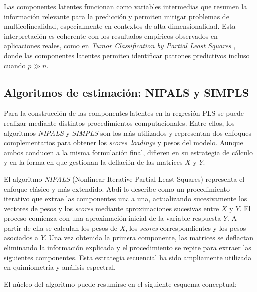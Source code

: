 \documentclass[12pt,a4paper]{report}
\begin{document}
Las componentes latentes funcionan como variables intermedias que resumen la información relevante para la predicción y permiten mitigar problemas de multicolinealidad, especialmente en contextos de alta dimensionalidad. Esta interpretación es coherente con los resultados empíricos observados en aplicaciones reales, como en \textit{Tumor Classification by Partial Least Squares} \cite{nguyen2002}, donde las componentes latentes permiten identificar patrones predictivos incluso cuando \(p \gg n\).


\subsection{Algoritmos de estimación: NIPALS y SIMPLS}

Para la construcción de las componentes latentes en la regresión PLS se puede realizar mediante distintos procedimientos computacionales. Entre ellos, los algoritmos \textit{NIPALS} y \textit{SIMPLS} son los más utilizados y representan dos enfoques complementarios para obtener los \textit{scores}, \textit{loadings} y pesos del modelo. Aunque ambos conducen a la misma formulación final, difieren en su estrategia de cálculo y en la forma en que gestionan la deflación de las matrices \(X\) y \(Y\).

El algoritmo \textit{NIPALS} (Nonlinear Iterative Partial Least Squares) representa el enfoque clásico y más extendido. Abdi \cite{abdi2010} lo describe como un procedimiento iterativo que extrae las componentes una a una, actualizando sucesivamente los vectores de pesos y los \textit{scores} mediante aproximaciones sucesivas entre \(X\) y \(Y\). El proceso comienza con una aproximación inicial de la variable respuesta \(Y\). A partir de ella se calculan los pesos de \(X\), los \textit{scores} correspondientes y los pesos asociados a \(Y\). Una vez obtenida la primera componente, las matrices se deflactan eliminando la información explicada y el procedimiento se repite para extraer las siguientes componentes. Esta estrategia secuencial ha sido ampliamente utilizada en quimiometría y análisis espectral.

El núcleo del algoritmo puede resumirse en el siguiente esquema conceptual:
\end{document}
